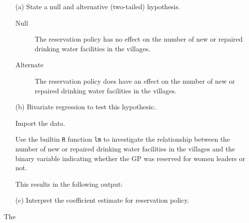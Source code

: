 \documentclass[12pt,letterpaper]{article}
\begin{document}
\newpage
\begin{enumerate}
	\item [(a)] State a null and alternative (two-tailed) hypothesis. 
	
	\begin{description}
	  \item [Null] The reservation policy has no effect on the number of new or 
	  repaired drinking water facilities in the villages.
	  \item [Alternate] The reservation policy does have an effect on the number of new or 
	  repaired drinking water facilities in the villages.
	\end{description}
	

	
	\item [(b)] Bivariate regression to test this hypothesis:.

  Import the data.
	  
	
	Use the builtin \texttt{R} function \texttt{lm} to investigate the relationship
	between the number of new or repaired drinking water facilities in the villages
	and the binary variable indicating whether the GP was reserved for women leaders or not.
	  
	
	
	This results in the following output:
	
	
	
	
	\item [(c)] Interpret the coefficient estimate for reservation policy. 
\end{enumerate}
  The 
\end{document}
